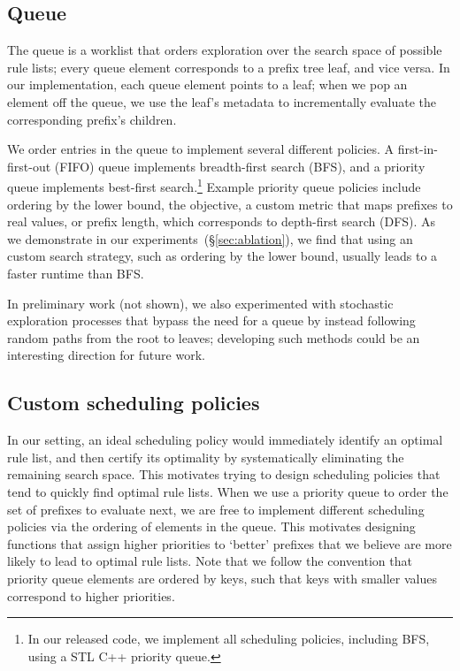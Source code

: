 \subsection{Queue}
\label{sec:queue}

The queue is a worklist that orders exploration over the search space of possible
rule lists; every queue element corresponds to a prefix tree leaf, and vice versa.
%
In our implementation, each queue element points to a leaf;
when we pop an element off the queue, we use the leaf's metadata to
incrementally evaluate the corresponding prefix's children.

We order entries in the queue to implement several different policies.
%
A first-in-first-out (FIFO) queue implements breadth-first search (BFS),
and a priority queue implements best-first search.\footnote{In our released code,
we implement all scheduling policies, including BFS, using a STL C++ priority queue.}
%
Example priority queue policies include ordering
by the lower bound, the objective, a custom metric that maps prefixes to real values,
or prefix length, which corresponds to depth-first search (DFS).
%
As we demonstrate in our experiments~(\S\ref{sec:ablation}),
we find that using an custom search strategy,
such as ordering by the lower bound, usually leads to a faster runtime than BFS.

In preliminary work (not shown), we also experimented with
stochastic exploration processes that bypass the need for a queue
by instead following random paths from the root to leaves;
developing such methods could be an interesting direction for future work.

\subsection{Custom scheduling policies}
\label{sec:scheduling}

In our setting, an ideal scheduling policy would immediately identify an optimal
rule list, and then certify its optimality by systematically eliminating the
remaining search space.
%
This motivates trying to design scheduling policies that tend to quickly find optimal rule lists.
%
When we use a priority queue to order the set of prefixes to evaluate next,
we are free to implement different scheduling policies via the ordering of
elements in the queue.
%
This motivates designing functions that assign higher priorities to `better'
prefixes that we believe are more likely to lead to optimal rule lists.
%
Note that we follow the convention that priority queue elements are ordered
by keys, such that keys with smaller values correspond to higher priorities.

